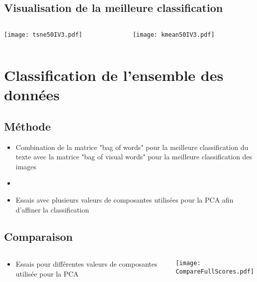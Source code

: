 \documentclass[8pt,aspectratio=169,hyperref={unicode=true}]{beamer}
\begin{document}
\subsection{Visualisation de la meilleure classification}
\begin{frame}{\insertsubsection}
    \begin{columns}
        \begin{column}{.5\textwidth}
            \texttt{[image: tsne50IV3.pdf]}
        \end{column}
        \begin{column}{.5\textwidth}
            \texttt{[image: kmean50IV3.pdf]}
        \end{column}
    \end{columns}
\end{frame}


\section{Classification de l'ensemble des données}

\subsection{Méthode}
\begin{frame}{\insertsubsection}
    \begin{itemize}
        \item Combination de la matrice "bag of words" pour la meilleure classification du texte avec la matrice "bag of visual words" pour la meilleure classification des images
        \item[]
        \item Essais avec plusieurs valeurs de composantes utilisées pour la PCA afin d'affiner la classification
    \end{itemize}
\end{frame}

\subsection{Comparaison}
\begin{frame}{\insertsubsection}
    \begin{columns}
        \begin{column}{.4\textwidth}
            \begin{itemize}
                \item Essais pour différentes valeurs de composantes utilisée pour la PCA
            \end{itemize}
        \end{column}
        \begin{column}{.6\textwidth}
            \texttt{[image: CompareFullScores.pdf]}
        \end{column}
    \end{columns}
\end{frame}
\end{document}
